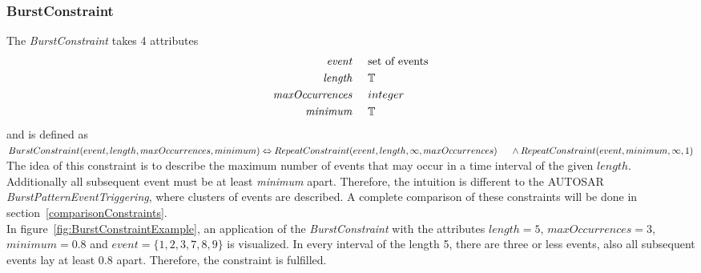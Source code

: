 	\subsubsection{BurstConstraint}
		The \emph{BurstConstraint} takes 4 attributes
		\begin{align*}
			\emph{event} 			& \hspace{.5cm}\text{set of events}\\
			\emph{length}			& \hspace{.5cm} \mathbb{T}\\
			\emph{maxOccurrences}	& \hspace{.5cm} integer\\
			\emph{minimum}			& \hspace{.5cm} \mathbb{T}
		\end{align*}
		and is defined as \\[10pt]
		\begin{math}
			BurstConstraint ( event, length, maxOccurrences, minimum )\\
			\Leftrightarrow RepeatConstraint(event, length, \infty, maxOccurrences)\\
			\text{\hspace{.5cm}}\land RepeatConstraint(event, minimum, \infty, 1)
		\end{math}\\[10pt]
		 The idea of this constraint is to describe the maximum number of events that may occur in a time interval of the given $length$. Additionally all subsequent event must be at least \emph{minimum} apart. Therefore, the intuition is different to the AUTOSAR \emph{BurstPatternEventTriggering}, where clusters of events are described. A complete comparison of these constraints will be done in section~\ref{comparisonConstraints}.\\
		 In figure~\ref{fig:BurstConstraintExample}, an application of the \emph{BurstConstraint} with the attributes $length=5$, $maxOccurrences=3$, $minimum=0.8$ and $event = \{1,2,3,7,8,9\}$ is visualized. In every interval of the length 5, there are three or less events, also all subsequent events lay at least $0.8$ apart. Therefore, the constraint is fulfilled.
